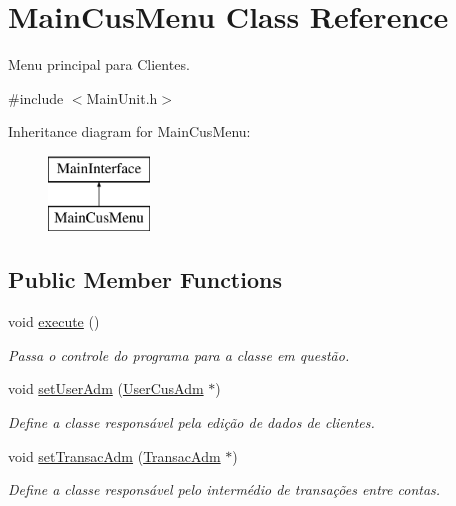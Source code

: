 \hypertarget{classMainCusMenu}{\section{Main\-Cus\-Menu Class Reference}
\label{dc/d35/classMainCusMenu}
}


Menu principal para Clientes.  




{\ttfamily \#include $<$Main\-Unit.\-h$>$}

Inheritance diagram for Main\-Cus\-Menu\-:\begin{figure}[H]
\begin{center}
\leavevmode
\includegraphics[height=2.000000cm]{dc/d35/classMainCusMenu}
\end{center}
\end{figure}
\subsection*{Public Member Functions}
\begin{DoxyCompactItemize}
\item 
void \hyperlink{classMainCusMenu_a91a3ffa75a1deb30dfc6eb604f1a1a2d}{execute} ()
\begin{DoxyCompactList}\small\item\em Passa o controle do programa para a classe em questão. \end{DoxyCompactList}\item 
void \hyperlink{classMainCusMenu_aea07e41b2f2c24496e3ce7a8f55b5332}{set\-User\-Adm} (\hyperlink{classUserCusAdm}{User\-Cus\-Adm} $\ast$)
\begin{DoxyCompactList}\small\item\em Define a classe responsável pela edição de dados de clientes. \end{DoxyCompactList}\item 
void \hyperlink{classMainCusMenu_aa338655efeeb61c43a8089c5577ce47b}{set\-Transac\-Adm} (\hyperlink{classTransacAdm}{Transac\-Adm} $\ast$)
\begin{DoxyCompactList}\small\item\em Define a classe responsável pelo intermédio de transações entre contas. \end{DoxyCompactList}\end{DoxyCompactItemize}


